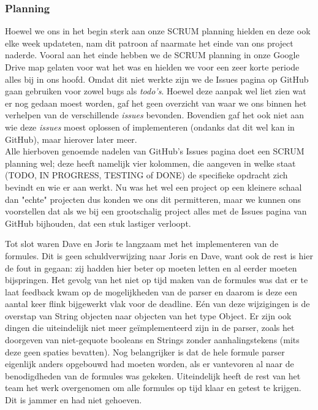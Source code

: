 \documentclass[a4paper,11pt]{article}
\begin{document}
\subsubsection{Planning}
Hoewel we ons in het begin sterk aan onze SCRUM planning hielden en deze ook elke week updateten, nam dit patroon af naarmate het einde van ons project naderde. Vooral aan het einde hebben we de SCRUM planning in onze Google Drive map gelaten voor wat het was en hielden we voor een zeer korte periode alles bij in ons hoofd. Omdat dit niet werkte zijn we de Issues pagina op GitHub gaan gebruiken voor zowel bugs als \textit{todo's}. Hoewel deze aanpak wel liet zien wat er nog gedaan moest worden, gaf het geen overzicht van waar we ons binnen het verhelpen van de verschillende \textit{issues} bevonden. Bovendien gaf het ook niet aan wie deze \textit{issues} moest oplossen of implementeren (ondanks dat dit wel kan in GitHub), maar hierover later meer.\\

Alle hierboven genoemde nadelen van GitHub's Issues pagina doet een SCRUM planning wel; deze heeft namelijk vier kolommen, die aangeven in welke staat (TODO, IN PROGRESS, TESTING of DONE) de specifieke opdracht zich bevindt en wie er aan werkt. Nu was het wel een project op een kleinere schaal dan "echte" projecten dus konden we ons dit permitteren, maar we kunnen ons voorstellen dat als we bij een grootschalig project alles met de Issues pagina van GitHub bijhouden, dat een stuk lastiger verloopt.

Tot slot waren Dave en Joris te langzaam met het implementeren van de formules. Dit is geen schuldverwijzing naar Joris en Dave, want ook de rest is hier de fout in gegaan: zij hadden hier beter op moeten letten en al eerder moeten bijspringen. Het gevolg van het niet op tijd maken van de formules was dat er te laat feedback kwam op de mogelijkheden van de parser en daarom is deze een aantal keer flink bijgewerkt vlak voor de deadline. Eén van deze wijzigingen is de overstap van String objecten naar objecten van het type Object. Er zijn ook dingen die uiteindelijk niet meer geïmplementeerd zijn in de parser, zoals het doorgeven van niet-gequote booleans en Strings zonder aanhalingstekens (mits deze geen spaties bevatten). Nog belangrijker is dat de hele formule parser eigenlijk anders opgebouwd had moeten worden, als er vantevoren al naar de benodigdheden van de formules was gekeken. Uiteindelijk heeft de rest van het team het werk overgenomen om alle formules op tijd klaar en getest te krijgen. Dit is jammer en had niet gehoeven.
\end{document}
